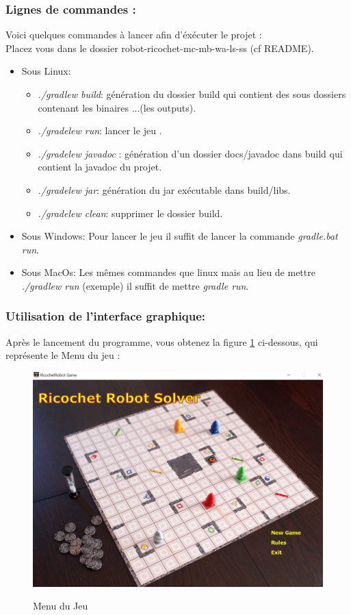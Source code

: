 \documentclass[12pt, a4paper, openany]{article}
\begin{document}
\subsubsection{Lignes de commandes :}
Voici quelques commandes à lancer afin d'éxécuter le projet : \\Placez vous dans le dossier robot-ricochet-mc-mb-wa-ls-ss (cf README).
\begin{itemize}
 \item Sous Linux:
	\begin{itemize}
	\item \textit{./gradlew build}: génération du dossier build qui contient des sous dossiers contenant les binaires ...(les outputs).
 	 \item \textit{ ./gradelew run}: lancer le jeu .
 	\item \textit{ ./gradelew javadoc} : génération d'un dossier docs/javadoc dans build qui contient la javadoc du projet.
  	\item \textit{./gradelew jar}: génération du jar exécutable dans build/libs.
 	\item \textit{ ./gradelew clean}: supprimer le dossier build.
	\end{itemize}
 \item Sous Windows:  Pour lancer le jeu il suffit de lancer la commande \textit{gradle.bat run}.
 \item Sous MacOs: Les mêmes commandes que linux mais au lieu de mettre \textit{./gradlew run} (exemple) il suffit de mettre \textit{gradle run}.
\end{itemize}
\newpage
\subsubsection{Utilisation de l'interface graphique:}
Après le lancement du  programme, vous obtenez la figure \ref{fig:Menu} ci-dessous, qui représente le Menu du jeu :
\begin{figure}[H]
\begin{center}
 \includegraphics[scale=0.4]{Screen1.png}
    \\[1cm] 
\end{center}  
\caption{Menu du Jeu} 
\label{fig:Menu}
\end{figure}
\end{document}
